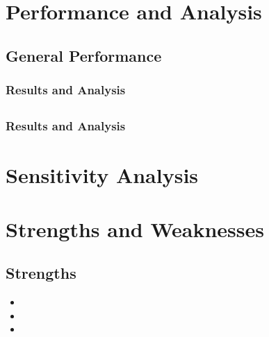 \documentclass[12pt,a4paper,titlepage]{article}
\begin{document}
\section{}
\label{sec:}

\section{Performance and Analysis}
\label{sec:performance-and-analysis}

\subsection{General Performance}
\label{sec:general-performance}

\subsubsection*{Results and Analysis}

\subsection{}
\label{sec:}

\subsubsection*{Results and Analysis}

\section{Sensitivity Analysis}
\label{sec:sensitivity-analysis}

\section{}
\label{sec:}

\section{Strengths and Weaknesses}
\label{sec:strengths-and-weaknesses}

\subsection*{Strengths}
\label{sec:strengths}

\begin{itemize}
    \item
    \item
    \item
\end{itemize}
\end{document}
